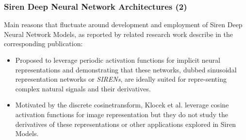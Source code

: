 





\begin{frame}
\frametitle{Siren Deep Neural Network Architectures (2)}
Main reasons that fluctuate around development and employment  of Siren Deep Neural Network Models, as reported by related research work describe in the corresponding publication:
\begin{itemize}
\item Proposed to leverage periodic activation functions for implicit neural representations and demonstrating that these networks, dubbed sinusoidal representation networks or \textit{SIRENs}, are ideally suited for repre-senting complex natural signals and their derivatives.
\item Motivated by the discrete cosinetransform, Klocek et al. leverage cosine activation functions for image representation but they do not study the derivatives of these representations or other applications explored in Siren Models.
\end{itemize}
\end{frame}